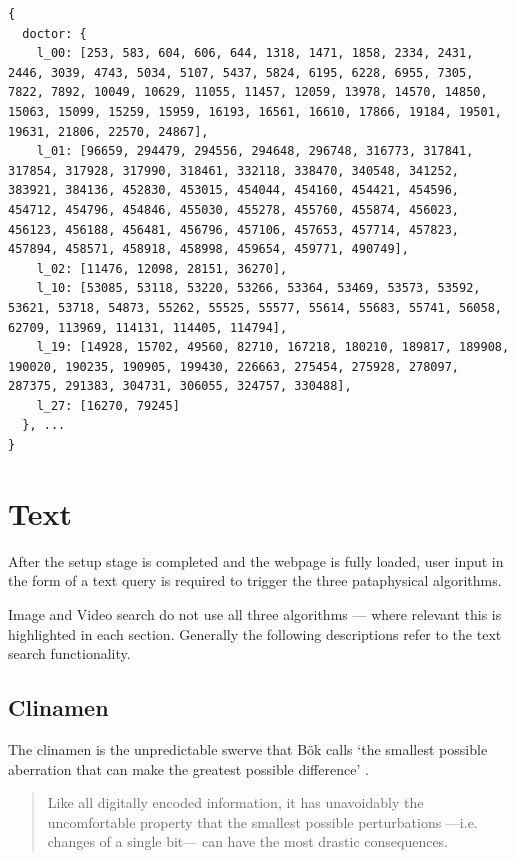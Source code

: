 \label{c:pos}
\begin{verbatim}
{
  doctor: {
    l_00: [253, 583, 604, 606, 644, 1318, 1471, 1858, 2334, 2431, 2446, 3039, 4743, 5034, 5107, 5437, 5824, 6195, 6228, 6955, 7305, 7822, 7892, 10049, 10629, 11055, 11457, 12059, 13978, 14570, 14850, 15063, 15099, 15259, 15959, 16193, 16561, 16610, 17866, 19184, 19501, 19631, 21806, 22570, 24867],
    l_01: [96659, 294479, 294556, 294648, 296748, 316773, 317841, 317854, 317928, 317990, 318461, 332118, 338470, 340548, 341252, 383921, 384136, 452830, 453015, 454044, 454160, 454421, 454596, 454712, 454796, 454846, 455030, 455278, 455760, 455874, 456023, 456123, 456188, 456481, 456796, 457106, 457653, 457714, 457823, 457894, 458571, 458918, 458998, 459654, 459771, 490749],
    l_02: [11476, 12098, 28151, 36270],
    l_10: [53085, 53118, 53220, 53266, 53364, 53469, 53573, 53592, 53621, 53718, 54873, 55262, 55525, 55577, 55614, 55683, 55741, 56058, 62709, 113969, 114131, 114405, 114794],
    l_19: [14928, 15702, 49560, 82710, 167218, 180210, 189817, 189908, 190020, 190235, 190905, 199430, 226663, 275454, 275928, 278097, 287375, 291383, 304731, 306055, 324757, 330488],
    l_27: [16270, 79245]
  }, ...
}
\end{verbatim}


\section{Text}
\label{s:algorithms}

After the setup stage is completed and the webpage is fully loaded, user input in the form of a text query is required to trigger the three pataphysical algorithms.

Image and Video search do not use all three algorithms --- where relevant this is highlighted in each section. Generally the following descriptions refer to the text search functionality.



\subsection{Clinamen}
\label{s:clinamen}

The clinamen is the unpredictable swerve that Bök calls `the smallest possible aberration that can make the greatest possible difference' \parencite{Boek2002}.

\begin{quotation}
  Like all digitally encoded information, it has unavoidably the uncomfortable property that the smallest possible perturbations —i.e. changes of a single bit— can have the most drastic consequences. 
\end{quotation}

